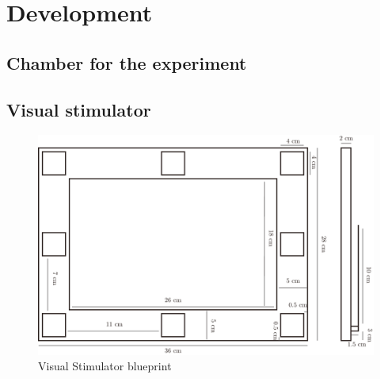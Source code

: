 \chapter{Development}

\label{ch:Development}

\setlength{\parindent}{4em}
\setlength{\parskip}{1em}
\renewcommand{\baselinestretch}{1.5}

\section{Chamber for the experiment}

\section{Visual stimulator}

\begin{figure}[ht]
	\centering
	\includegraphics[width=\textwidth]{chapter6/blueprint.pdf}
	\caption{Visual Stimulator blueprint}
\end{figure}